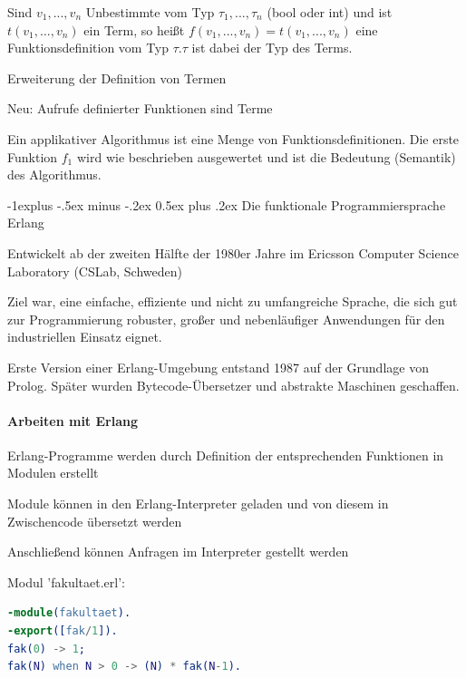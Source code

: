 \documentclass[10pt]{article}
\makeatletter
\renewcommand{\subsection}{\@startsection{subsection}{2}{0mm}%
                                {-1explus -.5ex minus -.2ex}%
                                {0.5ex plus .2ex}%
                                {\normalfont\normalsize\bfseries}}
\makeatother
\begin{document}
Sind $v_1, ..., v_n$ Unbestimmte vom Typ $\tau_1,...,\tau_n$ (bool oder int) und ist $t(v_1, ..., v_n)$ ein Term, so heißt $f(v_1, ..., v_n) = t(v_1, ..., v_n)$ eine Funktionsdefinition vom Typ $\tau .\tau$ ist dabei der Typ des Terms.

\begin{itemize*}
  \item Erweiterung der Definition von Termen
  \item Neu: Aufrufe definierter Funktionen sind Terme
\end{itemize*}

Ein applikativer Algorithmus ist eine Menge von Funktionsdefinitionen. Die erste Funktion $f_1$ wird wie beschrieben ausgewertet und ist die Bedeutung (Semantik) des Algorithmus.

\subsection{Die funktionale Programmiersprache Erlang}
\begin{itemize*}
  \item Entwickelt ab der zweiten Hälfte der 1980er Jahre im Ericsson Computer Science Laboratory (CSLab, Schweden)
  \item Ziel war, eine einfache, effiziente und nicht zu umfangreiche Sprache, die sich gut zur Programmierung robuster, großer und nebenläufiger Anwendungen für den industriellen Einsatz eignet.
  \item Erste Version einer Erlang-Umgebung entstand 1987 auf der Grundlage von Prolog. Später wurden Bytecode-Übersetzer und abstrakte Maschinen geschaffen.
\end{itemize*}

\paragraph{Arbeiten mit Erlang}

\begin{itemize*}
  \item Erlang-Programme werden durch Definition der entsprechenden Funktionen in Modulen erstellt
  \item Module können in den Erlang-Interpreter geladen und von diesem in Zwischencode übersetzt werden
  \item Anschließend können Anfragen im Interpreter gestellt werden
\end{itemize*}

Modul 'fakultaet.erl':
\begin{lstlisting}[language=erlang]
-module(fakultaet).
-export([fak/1]).
fak(0) -> 1;
fak(N) when N > 0 -> (N) * fak(N-1).
\end{lstlisting}
\end{document}
